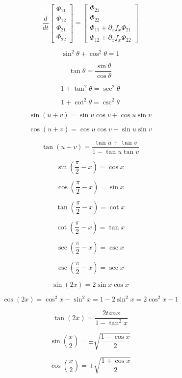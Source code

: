 \documentclass[10pt]{article}
\begin{document}
\begin{equation}
  \frac{d}{dt} \left[ \begin{array}{c} \Phi_{11} \\ \Phi_{12} \\ \Phi_{21} \\ \Phi_{22} \end{array} \right]
    = 
  \left[ \begin{array}{c} \Phi_{21}                                   \\ \Phi_{22} \\
                          \Phi_{11} + \partial_x f_{\dot x} \Phi_{21} \\ \Phi_{12} + \partial_x f_{\dot x} \Phi_{22} 
         \end{array} 
  \right]
\end{equation}

\newpage
\null

\[
\sin^2 \theta + \cos^2 \theta  = 1
\]

\[
\tan \theta = \frac{\sin \theta}{\cos \theta}
\]

\[
1 + \tan^2 \theta = \sec^2 \theta
\]

\[
1 + \cot^2 \theta = \csc^2 \theta
\]

\[
\sin( u + v ) = \sin u \cos v + \cos u \sin v
\]

\[
\cos(u + v) = \cos u \cos v - \sin u \sin v
\]

\[
\tan(u + v) = \frac{ \tan u + \tan v}{1 - \tan u \tan v}
\]

\[
\sin \left( \frac{\pi}{2} - x \right) = \cos x
\]

\[
\cos \left( \frac{\pi}{2} - x \right) = \sin x
\]

\[
\tan \left( \frac{\pi}{2} - x \right) = \cot x
\]

\[
\cot \left( \frac{\pi}{2} - x \right) = \tan x
\]

\[
\sec \left( \frac{\pi}{2} - x \right) = \csc x
\]

\[
\csc \left( \frac{\pi}{2} - x \right) = \sec x
\]

\[
\sin(2 x) = 2 \sin x \cos x
\]

\[
\cos(2 x) = \cos^2 x - \sin^2 x 
          = 1 - 2 \sin^2 x
          = 2 \cos^2 x - 1
\]

\[
\tan(2 x) = \frac{2 tan x}{1 - \tan^2 x}
\]

\[
  \sin \left( \frac{x}{2} \right) = \pm \sqrt{ \frac{1-\cos x}{2} }
\]

\[
  \cos \left( \frac{x}{2} \right) = \pm \sqrt{ \frac{1+\cos x}{2} }
\]
\end{document}
